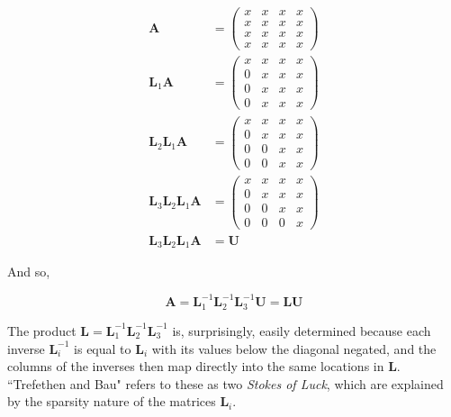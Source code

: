 \begin{equation}
\begin{split}
\mathbf{A} &=
\begin{pmatrix}
x & x & x & x \\
x & x & x & x \\
x & x & x & x \\
x & x & x & x
\end{pmatrix} \\
\mathbf{L}_1\mathbf{A} &=
\begin{pmatrix}
x & x & x & x \\
0 & x & x & x \\
0 & x & x & x \\
0 & x & x & x
\end{pmatrix} \\
\mathbf{L}_2\mathbf{L}_1\mathbf{A} &=
\begin{pmatrix}
x & x & x & x \\
0 & x & x & x \\
0 & 0 & x & x \\
0 & 0 & x & x
\end{pmatrix} \\
\mathbf{L}_3\mathbf{L}_2\mathbf{L}_1\mathbf{A} &=
\begin{pmatrix}
x & x & x & x \\
0 & x & x & x \\
0 & 0 & x & x \\
0 & 0 & 0 & x
\end{pmatrix} \\
\mathbf{L}_3\mathbf{L}_2\mathbf{L}_1\mathbf{A} &= \mathbf{U}
\end{split}
\end{equation}

And so,

\begin{equation}
\mathbf{A} = \mathbf{L}_1^{-1}\mathbf{L}_2^{-1}\mathbf{L}_3^{-1}\mathbf{U} = \mathbf{L}\mathbf{U}
\end{equation}

The product $\mathbf{L} = \mathbf{L}_1^{-1}\mathbf{L}_2^{-1}\mathbf{L}_3^{-1}$ is, surprisingly, easily determined because each inverse $\mathbf{L}_i^{-1}$ is equal to $\mathbf{L}_i$ with its values below the diagonal negated, and the columns of the inverses then map directly into the same locations in $\mathbf{L}$. ``Trefethen and Bau" refers to these as two \emph{Stokes of Luck}, which are explained by the sparsity nature of the matrices $\mathbf{L}_i$. 


